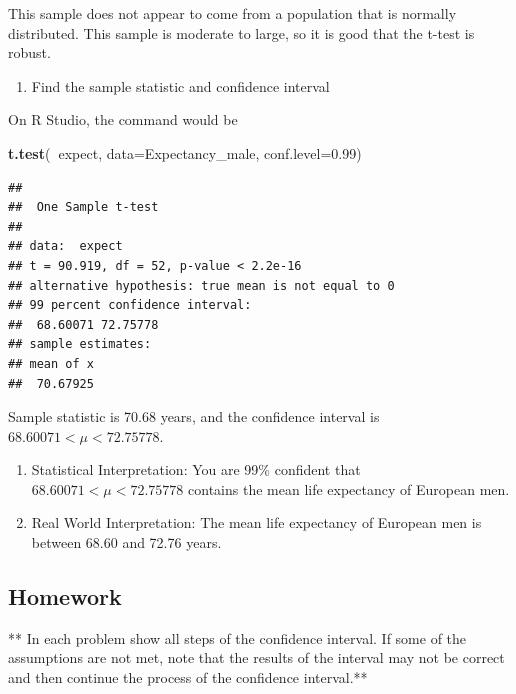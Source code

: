 \documentclass[
]{book}
\newenvironment{Shaded}{\begin{snugshade}}{\end{snugshade}}
\newcommand{\DataTypeTok}[1]{\textcolor[rgb]{0.13,0.29,0.53}{#1}}
\newcommand{\FloatTok}[1]{\textcolor[rgb]{0.00,0.00,0.81}{#1}}
\newcommand{\KeywordTok}[1]{\textcolor[rgb]{0.13,0.29,0.53}{\textbf{#1}}}
\newcommand{\NormalTok}[1]{#1}
\newcommand{\OperatorTok}[1]{\textcolor[rgb]{0.81,0.36,0.00}{\textbf{#1}}}
\providecommand{\tightlist}{%
  \setlength{\itemsep}{0pt}\setlength{\parskip}{0pt}}
\begin{document}
This sample does not appear to come from a population that is normally distributed. This sample is moderate to large, so it is good that the t-test is robust.

\begin{enumerate}
\def\labelenumi{\arabic{enumi}.}
\setcounter{enumi}{2}
\tightlist
\item
  Find the sample statistic and confidence interval
\end{enumerate}

On R Studio, the command would be

\begin{Shaded}
\begin{Highlighting}[]
\KeywordTok{t.test}\NormalTok{(}\OperatorTok{~}\NormalTok{expect, }\DataTypeTok{data=}\NormalTok{Expectancy_male, }\DataTypeTok{conf.level=}\FloatTok{0.99}\NormalTok{)}
\end{Highlighting}
\end{Shaded}

\begin{verbatim}
## 
## 	One Sample t-test
## 
## data:  expect
## t = 90.919, df = 52, p-value < 2.2e-16
## alternative hypothesis: true mean is not equal to 0
## 99 percent confidence interval:
##  68.60071 72.75778
## sample estimates:
## mean of x 
##  70.67925
\end{verbatim}

Sample statistic is 70.68 years, and the confidence interval is \(68.60071<\mu<72.75778\).

\begin{enumerate}
\def\labelenumi{\arabic{enumi}.}
\setcounter{enumi}{3}
\item
  Statistical Interpretation: You are 99\% confident that \(68.60071<\mu<72.75778\) contains the mean life expectancy of European men.
\item
  Real World Interpretation: The mean life expectancy of European men is between 68.60 and 72.76 years.
\end{enumerate}

\hypertarget{homework-2}{%
\subsection{Homework}\label{homework-2}}

** In each problem show all steps of the confidence interval. If some of the assumptions are not met, note that the results of the interval may not be correct and then continue the process of the confidence interval.**
\end{document}
